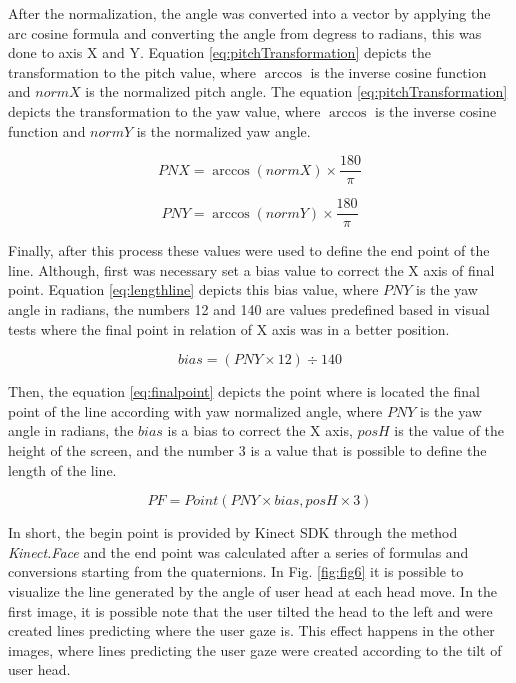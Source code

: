 \documentclass[10pt, conference]{IEEEtran}
\begin{document}
	After the normalization, the angle was converted into a vector by applying the arc cosine formula and converting the angle from degress to radians, this was done to axis X and Y.
	Equation \ref{eq:pitchTransformation} depicts the transformation to the pitch value, where $\arccos$ is the inverse cosine function and $normX$ is the normalized pitch angle. The equation \ref{eq:pitchTransformation} depicts the transformation to the yaw value, where $\arccos$ is the inverse cosine function and $normY$ is the normalized yaw angle.

	\begin{equation}
    	PNX = \arccos{(normX)} \times \frac{180}{\pi}
		\label{eq:pitchTransformation}
	\end{equation}
    
    \begin{equation}
    	PNY = \arccos{(normY)} \times \frac{180}{\pi}
		\label{eq:yawTransformation}
	\end{equation}

	Finally, after this process these values were used to define the end point of the line. Although, first was  necessary set a bias value to correct the X axis of final point. Equation \ref{eq:lengthline} depicts this bias value, where $PNY$ is the yaw angle in radians, the numbers 12 and 140 are values predefined based in visual tests where the final point in relation of X axis was in a better position.
    
    \begin{equation}
    	bias = (PNY \times 12) \div 140
		\label{eq:lengthline}
	\end{equation}
    
      Then, the equation \ref{eq:finalpoint} depicts the point where is located the final point of the line according with yaw normalized angle, where $PNY$ is the yaw angle in radians, the $bias$ is a bias to correct the X axis, $posH$ is the value of the height of the screen, and the number 3 is a value that is possible to define the length of the line.
    
    \begin{equation}
    	PF = Point(PNY \times bias, posH \times 3)
		\label{eq:finalpoint}
	\end{equation}
   
     
	In short, the begin point is provided by Kinect SDK through the method \emph{Kinect.Face} and the end point was calculated after a series of formulas and conversions starting from the quaternions. 
	In Fig. \ref{fig:fig6} it is possible to visualize the line generated by the angle of user head at each head move. 
	In the first image, it is possible note that the user tilted the head to the left and were created lines predicting where the user gaze is. 
	This effect happens in the other images, where lines predicting the user gaze were created according to the tilt of user head.
\end{document}
